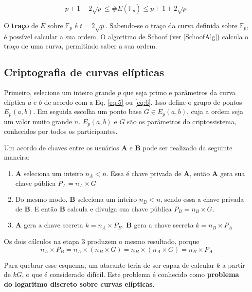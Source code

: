 \begin{equation}
p + 1 - 2\sqrt{p} \leq \#E(\mathbb{F}_p) \leq p + 1 + 2\sqrt{p}
\label{eq:HasseBounds}
\end{equation}

O \textbf{traço} de $E$ sobre $\mathbb{F}_p$ é $t = 2\sqrt{p}$. Sabendo-se o traço da curva definida sobre $\mathbb{F}_p$, é possível calcular a sua ordem. O algoritmo de Schoof (ver \ref{SchoofAlg}) calcula o traço de uma curva, permitindo saber a sua ordem.

%
%
\subsection{Criptografia de curvas elípticas} \label{sec:ecc}
Primeiro, selecione um inteiro grande \(p\) que seja primo e parâmetros da curva elíptica \(a\) e \(b\) de acordo com a Eq. \ref{eq:5} ou \ref{eq:6}. Isso define o grupo de pontos $E_p(a, b)$. Em seguida escolha um ponto base $G \in E_p(a, b)$, cuja a ordem seja um valor muito grande \(n\). $E_p(a, b)$ e \(G\) são os parâmetros do criptossistema, conhecidos por todos os participantes.

Um acordo de chaves entre os usuários \textbf{A} e \textbf{B} pode ser realizado da seguinte maneira:
\begin{enumerate}
\item \textbf{A} seleciona um inteiro \(n_A < n\). Essa é chave privada de \textbf{A}, então \textbf{A} gera sua chave pública $P_A = n_A \times G$
\item Do mesmo modo, \textbf{B} seleciona um inteiro \(n_B < n\), sendo essa a chave privada de \textbf{B}. E então \textbf{B} calcula e divulga sua chave pública $P_B = n_B \times G$.
\item \textbf{A} gera a chave secreta $k = n_A \times P_B$. \textbf{B} gera a chave secreta $k = n_B \times P_A$
\end{enumerate}

Os dois cálculos na etapa 3 produzem o mesmo resultado, porque
\begin{equation*}
n_A \times P_B = n_A \times (n_B \times G) = n_B \times (n_A \times G) = n_B \times P_A
\end{equation*}

Para quebrar esse esquema, um atacante teria de ser capaz de calcular \(k\) a partir de \(kG\), o que é considerado difícil. Este problema é conhecido como \textbf{problema do logaritmo discreto sobre curvas elípticas}.
